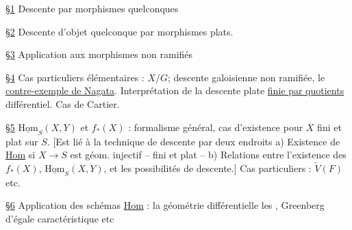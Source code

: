 

\uline{\S1} Descente  par morphismes quelconques


\uline{\S2} Descente d'objet quelconque par morphismes plats.

\uline{\S3} Application  aux morphismes non ramifiés

\uline{\S4} Cas particuliers élémentaires :  $X/G$; descente galoisienne non ramifiée, le \uline{contre-exemple de Nagata}. Interprétation de la descente plate \uline{finie par quotients}  différentiel. Cas de Cartier.



\uline{\S5} $\underline{\mathrm{Hom}}_S(X,Y)$ et $f_*(X)$ : formalisme général, cas d'existence pour $X$ fini et plat sur $S$. [Est lié à la technique de descente  par deux endroits a) Existence de \uline{Hom} si $X\to S$ est géom. injectif -- fini et plat -- b) Relations entre l'existence des $f_*(X)$, $\underline{\mathrm{Hom}}_S(X,Y)$, et les possibilités de descente.] Cas particuliers : $\check{V}(F)$ etc.


\uline{\S6} Application des schémas \uline{Hom} : la géométrie différentielle les , Greenberg d'égale caractéristique etc

